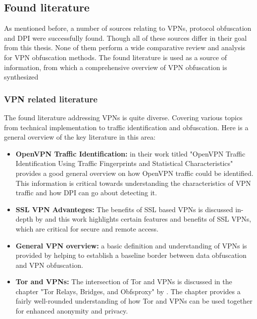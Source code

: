 \documentclass[12pt, fleqn, a4paper]{article}
\begin{document}
\subsection{Found literature}
As mentioned before, a number of sources relating to VPNs, protocol obfuscation and DPI were successfully found. Though all of these sources differ in their goal from this thesis. None of them perform a wide comparative review and analysis for VPN obfuscation methods. The found literature is used as a source of information, from which a comprehensive overview of VPN obfuscation is synthesized
\subsubsection{VPN related literature}
The found literature addressing VPNs is quite diverse. Covering various topics from technical implementation to traffic identification and obfuscation. Here is a general overview of the key literature in this area:
\begin{itemize}
  \item \textbf{OpenVPN Traffic Identification:} \cite{openvpn} in their work titled "OpenVPN Traffic Identification Using Traffic Fingerprints and Statistical Characteristics" provides a good general overview on how OpenVPN traffic could be identified. This information is critical towards understanding the characteristics of VPN traffic and how DPI can go about detecting it.
  \item \textbf{SSL VPN Advanteges:} The benefits of SSL based VPNs is discussed in-depth by \cite{sslvpn} and this work highlights certain features and benefits of SSL VPNs, which are critical for secure and remote access.
  \item \textbf{General VPN overview:} a basic definition and understanding of VPNs is provided by \cite{whatvpn} helping to establish a baseline border between data obfuscation and VPN obfuscation.
  \item \textbf{Tor and VPNs:} The intersection of Tor and VPNs is discussed in the chapter "Tor Relays, Bridges, and Obfsproxy" by \cite{bridges}. The chapter provides a fairly well-rounded understanding of how Tor and VPNs can be used together for enhanced anonymity and privacy.
\end{itemize}
\end{document}
